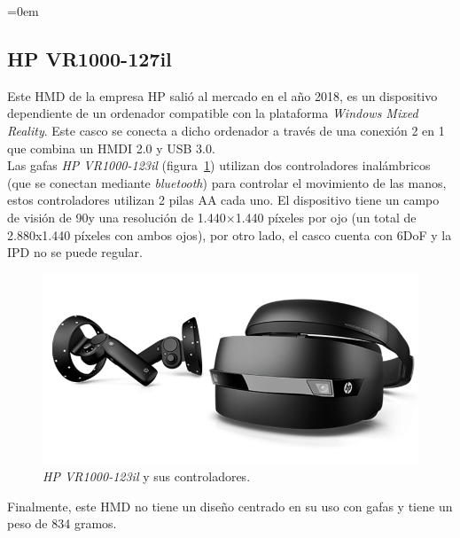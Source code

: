 \parindent=0em
\subsection{HP VR1000-127il}
\noindent

Este HMD de la empresa HP salió al mercado en el año 2018, es un dispositivo dependiente de un ordenador compatible con la plataforma \textit{Windows Mixed Reality}. Este casco se conecta a dicho ordenador a través de una conexión 2 en 1 que combina un HMDI 2.0 y USB 3.0. \\

Las gafas \textit{HP VR1000-123il} (figura~\ref{fig:hpvr1000}) utilizan dos controladores inalámbricos (que se conectan mediante \textit{bluetooth}) para controlar el movimiento de las manos, estos controladores utilizan 2 pilas AA cada uno. El dispositivo tiene un campo de visión de 90\degree  y una resolución de 1.440×1.440 píxeles por ojo (un total de 2.880x1.440 píxeles con ambos ojos), por otro lado, el casco cuenta con 6DoF y la IPD no se puede regular. 

\begin{figure}[H]
    \centering
    \includegraphics[scale=0.5]{Images/Estado del arte/HP VR1000.png}
    \caption[\textit{HP VR1000-123il} y sus controladores]{\textit{HP VR1000-123il} y sus controladores\footnotemark.}
    \label{fig:hpvr1000}
\end{figure}

Finalmente, este HMD no tiene un diseño centrado en su uso con gafas y tiene un peso de 834 gramos. 